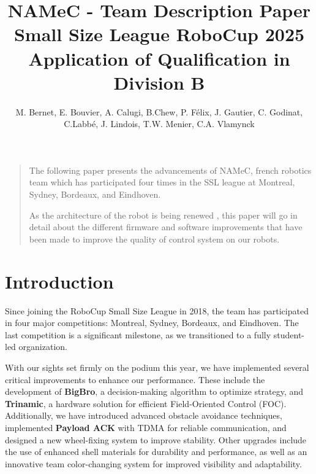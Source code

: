 \title{
  NAMeC - Team Description Paper \\
  Small Size League RoboCup 2025 \\
  Application of Qualification in Division B
}


\author{
    M. Bernet, E. Bouvier, A. Calugi, B.Chew, P. Félix, J. Gautier, C. Godinat,
    C.Labbé, J. Lindois, T.W. Menier, C.A. Vlamynck
}



\maketitle

\renewenvironment{abstract}
{\begin{quote}
\noindent \par{\bfseries \abstractname}}
{\medskip\noindent
\end{quote}
}

\begin{abstract}
The following paper presents the advancements of NAMeC, french robotics team 
which has participated four times in the SSL league at Montreal, Sydney, Bordeaux, and Eindhoven.
  
As the architecture of the robot is being renewed \cite{tdp2023}, this paper will go
in detail about the different firmware and software improvements
that have been made to improve the quality of control system on our robots.
\end{abstract}


\section{Introduction}

Since joining the RoboCup Small Size League in 2018, the team has participated in four major competitions: Montreal, Sydney, Bordeaux, and Eindhoven.
The last competition is a significant milestone, as we transitioned to a fully student-led organization.

With our sights set firmly on the podium this year, we have implemented several critical improvements to enhance our performance.
These include the development of \textbf{BigBro}, a decision-making algorithm to optimize strategy, and \textbf{Trinamic},
a hardware solution for efficient Field-Oriented Control (FOC). Additionally, we have introduced advanced obstacle avoidance techniques,
implemented \textbf{Payload ACK} with TDMA for reliable communication, and designed a new wheel-fixing system to improve stability.
Other upgrades include the use of enhanced shell materials for durability and performance, as well as an innovative team color-changing
system for improved visibility and adaptability.

